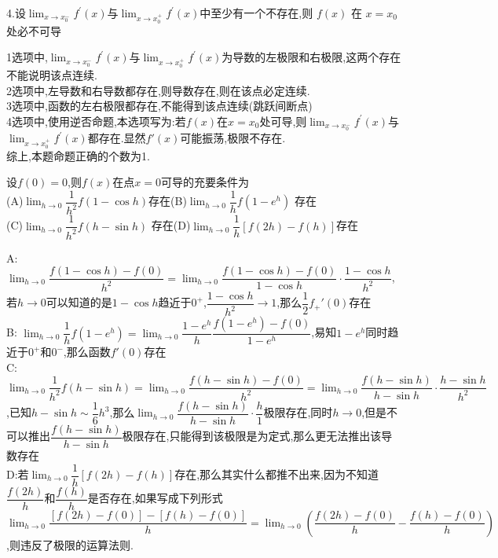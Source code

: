 \documentclass[8pt a4paper, oneside, UTF8]{ctexbook}  %
\begin{document}
\begin{sloppypar}
\begin{problem}
    4.设$\lim_{x\to x_{0}^{-}}f^{\prime}(x)$与$\lim_{x\to x_{0}^{+}}f^{\prime}(x)$中至少有一个不存在,则 $f(x)$ 在 $x=x_0$ 处必不可导
    \end{problem}
    \begin{solution}
        1选项中,$\lim_{x\to x_0^-}f^{\prime}(x)$与$\lim_{x\to x_0^+}f^{\prime}(x)$为导数的左极限和右极限,这两个存在不能说明该点连续.\\
        2选项中,左导数和右导数都存在,则导数存在,则在该点必定连续.\\
        3选项中,函数的左右极限都存在,不能得到该点连续(跳跃间断点)\\
        4选项中,使用逆否命题,本选项写为:若$f(x)$在$x=x_0$处可导,则$\lim_{x\to x_{0}^{-}}f^{\prime}(x)$与$\lim_{x\to x_{0}^{+}}f^{\prime}(x)$都存在.显然$f'(x)$可能振荡,极限不存在.\\
        综上,本题命题正确的个数为1.
    \end{solution}
    \begin{problem}
    设$f(0)=0$,则$f(x)$在点$x=0$可导的充要条件为\\
    (A)$\lim_{h\to0}\dfrac{1}{h^{2}}f(1-\cos h)$存在\quad(B)$\lim_{h\to0}\dfrac{1}{h}f(1-e^h)$ 存在\\
    (C)$\lim_{h\to0}\dfrac1{h^2}f(h-\sin h)$ 存在\quad(D)$\lim_{h\to0}\dfrac{1}{h}[f(2h)-f(h)]$存在
    \end{problem}
    \begin{solution}
        A: $\lim_{h \to 0}\dfrac{f(1 -\cos h)-f(0)}{h^2}=\lim_{h \to 0}\dfrac{f(1-\cos h)-f(0)}{1-\cos h}\cdot \dfrac{1-\cos h}{h^2}$,若$h \to 0$可以知道的是$1- \cos h$趋近于$0^+$,$\dfrac{1 - \cos h}{h^2} \to 1$,那么$\dfrac{1}{2}f_+'(0)$存在\\
        B: $\lim_{h \to 0}\dfrac{1}{h}f(1-e^h)=\lim_{h \to 0}\dfrac{1-e^h}{h}\dfrac{f(1-e^h)-f(0)}{1-e^h}$,易知$1-e^h$同时趋近于$0^+$和$0^-$,那么函数$f'(0)$存在\\
        C:$\lim_{h \to 0}\dfrac{1}{h^2}f(h- \sin h)=\lim_{h\to 0}\dfrac{f(h-\sin h)-f(0)}{h^2}=\lim_{h \to 0}\dfrac{f(h-\sin h)}{h -\sin h}\cdot \dfrac{h-\sin h}{h^2}$,已知$h -\sin h \sim \dfrac{1}{6}h^3$,那么$\lim_{h \to 0}\dfrac{f(h-\sin h)}{h -\sin h}\cdot \dfrac{h}{1}$极限存在,同时$h \to 0$,但是不可以推出$\dfrac{f(h-\sin h)}{h-\sin h}$极限存在,只能得到该极限是为定式,那么更无法推出该导数存在\\
        D:若$\lim_{h \to 0}\dfrac{1}{h}[f(2h)-f(h)]$存在,那么其实什么都推不出来,因为不知道$\dfrac{f(2h)}{h}$和$\dfrac{f(h)}{h}$是否存在,如果写成下列形式$\lim_{h \to 0}\dfrac{[f(2h)-f(0)]-[f(h)-f(0)]}{h}=\lim_{h \to 0}\left(\dfrac{f(2h)-f(0)}{h}-\dfrac{f(h)-f(0)}{h}\right)$,则违反了极限的运算法则.\\

\end{solution}
\end{sloppypar}
\end{document}
